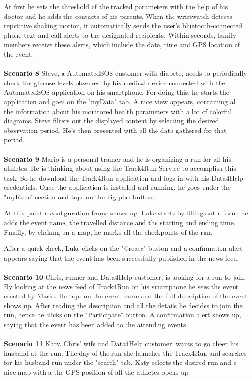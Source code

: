 At first he sets the threshold of the tracked parameters with the help of his doctor and he adds the contacts of his parents. When the wristwatch detects repetitive shaking motion, it automatically sends the user’s bluetooth-connected phone text and call alerts to the designated recipients. Within seconds, family members receive these alerts, which include the date, time and GPS location of the event.
\\
\\
\textbf{Scenario 8}
Steve, a AutomatedSOS customer with diabete, needs to periodically check the glucose levels observed by his medical device connected with the AutomatedSOS application on his smartphone. For doing this, he starts the application and goes on the "myData" tab. A nice view appears, containing all the information about his monitored health parameters with a lot of colorful diagrams. Steve filters out the displayed content by selecting the desired observation period. He's then presented with all the data gathered for that period. 
\\
\\
\textbf{Scenario 9}
Mario is a personal trainer and he is organizing a run for all his athletes. He is thinking about using the Track4Run Service to accomplish this task. So he download the Track4Run application and logs in with his Data4Help credentials. Once the application is installed and running, he goes under the "myRuns" section and taps on the big plus button. 

At this point a configuration frame shows up. Luke starts by filling out a form: he adds the event name, the travelled distance and the starting and ending time. Finally, by clicking on a map, he marks all the checkpoints of the run.

After a quick check, Luke clicks on the "Create" button and a confirmation alert appears saying that the event has been successfully published in the news feed.
\\
\\
\textbf{Scenario 10}
Chris, runner and Data4Help customer, is looking for a run to join. By looking at the  news feed of Track4Run on his smartphone he sees the event created by Mario. He taps on the event name and the full description of the event shows up. After reading the description and all the details he decides to join the run, hence he clicks on the "Participate" button. A confirmation alert shows up, saying that the event has been added to the attending events.
\\
\\
\textbf{Scenario 11}
Katy, Chris' wife and Data4Help customer,  wants to go cheer his husband at the run. The day of the run she launches the Track4Run and searches for his husband run under the "search" tab. Katy selects the desired run and a nice map with a the GPS position of all the athletes opens up.

